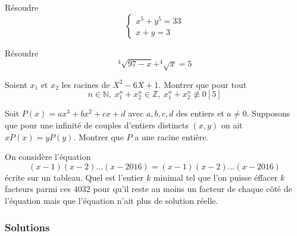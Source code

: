 \begin{exo}[M]
Résoudre $$\left \{
\begin{array}{rcl}
x^5+y^5=33 \\
x+y=3
\end{array}
\right. $$

\end{exo}

\begin{exo}[M-D]
Résoudre $$^4\sqrt{97-x}+^4\sqrt{x}=5$$

\end{exo}

\begin{exo}[M]
Soient $x_1$ et $x_2$ les racines de $X^2-6X+1$. Montrer que pour tout $$n\in \mathbb{N},\: x_1^n+x_2^n\in \mathbb{Z}, \: x_1^n+x_2^n\not\equiv 0[5 ] $$

\end{exo}



\begin{exo}[SL IMO 2002, A3, D]
Soit $P(x)=ax^3+bx^2+cx+d$ avec $a,b,c,d$ des entiers et $a\ne 0$. Supposons que pour une infinité de couples d'entiers distincts $(x,y)$ on ait $xP(x)=yP(y)$. Montrer que $P$ a une racine entière.
\end{exo}

\begin{exo}[IMO 2016 P5]
On considère l'équation 
$$(x-1)(x-2)...(x-2016)=(x-1)(x-2)...(x-2016) $$
écrite sur un tableau. Quel est l'entier $k$ minimal tel que l'on puisse éffacer $k$ facteurs parmi ces $4032$ pour qu'il reste au moins un facteur de chaque côté de l'équation mais que l'équation n'ait plus de solution réelle.
\end{exo}



\subsubsection{Solutions}

